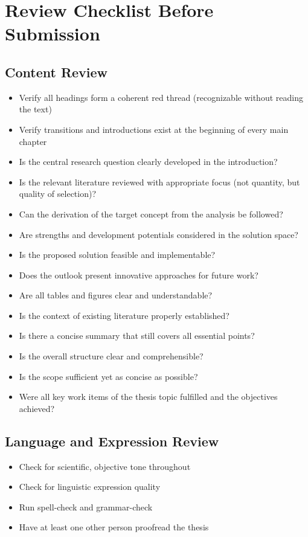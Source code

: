 \section{Review Checklist Before Submission}

\subsection{Content Review}
\begin{itemize}
    \item Verify all headings form a coherent red thread (recognizable without reading the text)
    \item Verify transitions and introductions exist at the beginning of every main chapter
    \item Is the central research question clearly developed in the introduction?
    \item Is the relevant literature reviewed with appropriate focus (not quantity, but quality of selection)?
    \item Can the derivation of the target concept from the analysis be followed?
    \item Are strengths and development potentials considered in the solution space?
    \item Is the proposed solution feasible and implementable?
    \item Does the outlook present innovative approaches for future work?
    \item Are all tables and figures clear and understandable?
    \item Is the context of existing literature properly established?
    \item Is there a concise summary that still covers all essential points?
    \item Is the overall structure clear and comprehensible?
    \item Is the scope sufficient yet as concise as possible?
    \item Were all key work items of the thesis topic fulfilled and the objectives achieved?
\end{itemize}

\subsection{Language and Expression Review}
\begin{itemize}
    \item Check for scientific, objective tone throughout
    \item Check for linguistic expression quality
    \item Run spell-check and grammar-check
    \item Have at least one other person proofread the thesis
\end{itemize}

